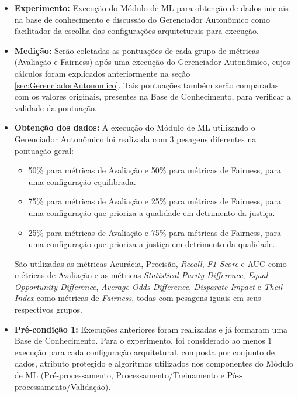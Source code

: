 \documentclass[portugues]{ic-tese}
\begin{document}
\begin{itemize}
\item \textbf{Experimento:} Execução do Módulo de ML para obtenção de dados iniciais na base de conhecimento e discussão do Gerenciador Autonômico como facilitador da escolha das configurações arquiteturais para execução.

\item \textbf{Medição:} Serão coletadas as pontuações de cada grupo de métricas (Avaliação e Fairness) após uma execução do Gerenciador Autonômico, cujos cálculos foram explicados anteriormente na seção \ref{sec:GerenciadorAutonomico}. Tais pontuações também serão comparadas com os valores originais, presentes na Base de Conhecimento, para verificar a validade da pontuação.

\item \textbf{Obtenção dos dados:} A execução do Módulo de ML utilizando o Gerenciador Autonômico foi realizada com 3 pesagens diferentes na pontuação geral:

\begin{itemize}
\item 50\% para métricas de Avaliação e 50\% para métricas de Fairness, para uma configuração equilibrada.
\item 75\% para métricas de Avaliação e 25\% para métricas de Fairness, para uma configuração que prioriza a qualidade em detrimento da justiça.
\item 25\% para métricas de Avaliação e 75\% para métricas de Fairness, para uma configuração que prioriza a justiça em detrimento da qualidade.
\end{itemize}

São utilizadas as métricas Acurácia, Precisão, \textit{Recall}, \textit{F1-Score} e AUC como métricas de Avaliação e as métricas \textit{Statistical Parity Difference}, \textit{Equal Opportunity Difference}, \textit{Average Odds Difference}, \textit{Disparate Impact} e \textit{Theil Index} como métricas de \textit{Fairness}, todas com pesagens iguais em seus respectivos grupos.

\item \textbf{Pré-condição 1:} Execuções anteriores foram realizadas e já formaram uma Base de Conhecimento. Para o experimento, foi considerado ao menos 1 execução para cada configuração arquitetural, composta por conjunto de dados, atributo protegido e algoritmos utilizados nos componentes do Módulo de ML (Pré-processamento, Processamento/Treinamento e Pós-processamento/Validação).


\end{itemize}
\end{document}
